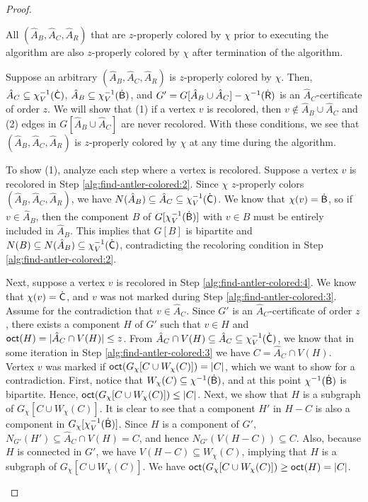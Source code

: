 \begin{proof}
  \begin{claim}\label{clm:find-antler-colored-properness}
      All \zoccs $(\hat{A}_B, \hat{A}_C, \hat{A}_R)$ that are $z$-properly colored by $\chi$
      prior to executing the algorithm are also $z$-properly colored by $\chi$ after termination of the algorithm.
  \end{claim}
  \begin{claimproof}
      Suppose an arbitrary \zocc $(\hat{A}_B, \hat{A}_C, \hat{A}_R)$ is $z$-properly colored by $\chi$.
      Then,
      $\hat{A}_C \subseteq \chi_V^{-1}(\mathsf{\dot{C}})$, 
      $\hat{A}_B \subseteq \chi_V^{-1}(\mathsf{\dot{B}})$, and
      $G'=G[\hat{A}_B \cup \hat{A}_C] - \chi^{-1}(\mathsf{\dot{R}})$ is an $\hat{A}_C$-certificate of order $z$.
      We will show that (1) if a vertex $v$ is recolored, then $v \not\in \hat{A}_B \cup \hat{A}_C$
      and (2) edges in $G[\hat{A}_B \cup \hat{A}_C]$ are never recolored.
      With these conditions, we see that $(\hat{A}_B, \hat{A}_C, \hat{A}_R)$ is $z$-properly colored by $\chi$ at any time during the algorithm.

      To show (1), analyze each step where a vertex is recolored.
      Suppose a vertex $v$ is recolored in Step \ref{alg:find-antler-colored:2}.
      Since $\chi$ $z$-properly colors $(\hat{A}_B, \hat{A}_C, \hat{A}_R)$,
      we have $N(\hat{A}_B) \subseteq \hat{A}_C \subseteq \chi_V^{-1}(\mathsf{\dot{C}})$.
      We know that $\chi(v)=\mathsf{\dot{B}}$, so if $v \in \hat{A}_B$,
      then the component $B$ of $G[\chi_V^{-1}(\mathsf{\dot{B}})]$ with $v \in B$ must be entirely included in $\hat{A}_B$.
      This implies that $G[B]$ is bipartite and $N(B) \subseteq N(\hat{A}_B) \subseteq \chi_V^{-1}(\mathsf{\dot{C}})$, contradicting the recoloring condition in Step \ref{alg:find-antler-colored:2}.
      
      Next, suppose a vertex $v$ is recolored in Step \ref{alg:find-antler-colored:4}.
      We know that $\chi(v)=\mathsf{\dot{C}}$, and $v$ was not marked during Step \ref{alg:find-antler-colored:3}.
      Assume for the contradiction that $v \in \hat{A}_C$.
      Since $G'$ is an $\hat{A}_C$-certificate of order $z$,
      there exists a component $H$ of $G'$ such that $v \in H$ and $\textnormal{\textsf{oct}}(H)=|\hat{A}_C \cap V(H)| \leq z$.
      From $\hat{A}_C \cap V(H) \subseteq \hat{A}_C \subseteq \chi_V^{-1}(\mathsf{\dot{C}})$,
      we know that in some iteration in Step \ref{alg:find-antler-colored:3}
      we have $C=\hat{A}_C \cap V(H)$.
      Vertex $v$ was marked if $\textnormal{\textsf{oct}}(G_\chi[C \cup W_\chi(C)]) = |C|$, which we want to show for a contradiction.
      First, notice that $W_\chi(C) \subseteq \chi^{-1}(\mathsf{\dot{B}})$, and at this point $\chi^{-1}(\mathsf{\dot{B}})$ is
      bipartite.
      Hence, $\textnormal{\textsf{oct}}(G_\chi[C \cup W_\chi(C)]) \leq |C|$.
      Next, we show that $H$ is a subgraph of $G_\chi[C \cup W_\chi(C)]$.
      It is clear to see that a component $H'$ in $H-C$ is also a component in $G_\chi[\chi_V^{-1}(\mathsf{\dot{B}})]$.
      Since $H$ is a component of $G'$, $N_{G'}(H') \subseteq \hat{A}_C \cap V(H) = C$,
      and hence $N_{G'}(V(H-C)) \subseteq C$.
      Also, because $H$ is connected in $G'$, we have $V(H-C) \subseteq W_\chi(C)$,
      implying that $H$ is a subgraph of $G_\chi[C \cup W_\chi(C)]$.
      We have $\textnormal{\textsf{oct}}(G_\chi[C \cup W_\chi(C)]) \geq \textnormal{\textsf{oct}}(H) = |C|$.


\end{claimproof}
\end{proof}
